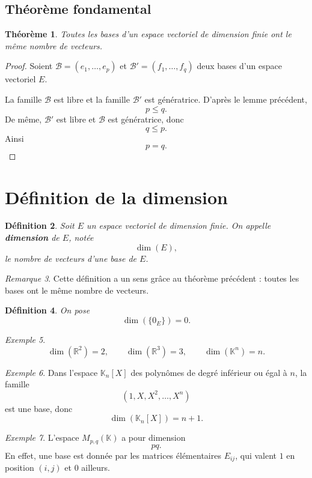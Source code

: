 \documentclass[11pt,a4paper]{article}
\newtheorem{definition}{Définition}[section]
\newtheorem{theoreme}[definition]{Théorème}
\theoremstyle{remark}
\newtheorem{remarque}[definition]{Remarque}
\newtheorem{exemple}[definition]{Exemple}
\newcommand{\R}{\mathbb{R}}
\newcommand{\K}{\mathbb{K}}
\begin{document}
\subsection{Théorème fondamental}

\begin{theoreme}
Toutes les bases d’un espace vectoriel de dimension finie ont le même nombre de vecteurs.
\end{theoreme}

\begin{proof}
Soient \(\mathcal{B}=(e_1,\dots,e_p)\) et \(\mathcal{B}'=(f_1,\dots,f_q)\) deux bases d’un espace vectoriel \(E\).

La famille \(\mathcal{B}\) est libre et la famille \(\mathcal{B}'\) est génératrice. D’après le lemme précédent,
\[
p\le q.
\]
De même, \(\mathcal{B}'\) est libre et \(\mathcal{B}\) est génératrice, donc
\[
q\le p.
\]
Ainsi
\[
p=q.
\]
\end{proof}

\section{Définition de la dimension}

\begin{definition}
Soit \(E\) un espace vectoriel de dimension finie. On appelle \textbf{dimension} de \(E\), notée
\[
\dim(E),
\]
le nombre de vecteurs d’une base de \(E\).
\end{definition}

\begin{remarque}
Cette définition a un sens grâce au théorème précédent : toutes les bases ont le même nombre de vecteurs.
\end{remarque}

\begin{definition}
On pose
\[
\dim(\{0_E\})=0.
\]
\end{definition}

\begin{exemple}
\[
\dim(\R^2)=2,\qquad \dim(\R^3)=3,\qquad \dim(\K^n)=n.
\]
\end{exemple}

\begin{exemple}
Dans l’espace \(\K_n[X]\) des polynômes de degré inférieur ou égal à \(n\), la famille
\[
(1,X,X^2,\dots,X^n)
\]
est une base, donc
\[
\dim(\K_n[X])=n+1.
\]
\end{exemple}

\begin{exemple}
L’espace \(M_{p,q}(\K)\) a pour dimension
\[
pq.
\]
En effet, une base est donnée par les matrices élémentaires \(E_{ij}\), qui valent \(1\) en position \((i,j)\) et \(0\) ailleurs.
\end{exemple}
\end{document}
